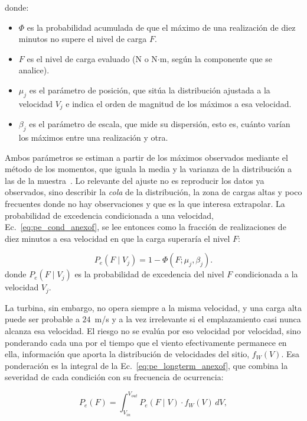 donde:
\begin{itemize}
    \item $\Phi$ es la probabilidad acumulada de que el máximo de una realización de diez minutos no supere el nivel de carga $F$.
    \item $F$ es el nivel de carga evaluado (N o N$\cdot$m, según la componente que se analice).
    \item $\mu_j$ es el parámetro de posición, que sitúa la distribución ajustada a la velocidad $V_j$ e indica el orden de magnitud de los máximos a esa velocidad.
    \item $\beta_j$ es el parámetro de escala, que mide su dispersión, esto es, cuánto varían los máximos entre una realización y otra.
\end{itemize}

Ambos parámetros se estiman a partir de los máximos observados mediante el método de los momentos, que iguala la media y la varianza de la distribución a las de la muestra~\parencite{Gumbel1958}. Lo relevante del ajuste no es reproducir los datos ya observados, sino describir la \textit{cola} de la distribución, la zona de cargas altas y poco frecuentes donde no hay observaciones y que es la que interesa extrapolar. La probabilidad de excedencia condicionada a una velocidad, Ec.~\ref{eq:pe_cond_anexof}, se lee entonces como la fracción de realizaciones de diez minutos a esa velocidad en que la carga superaría el nivel $F$:

\begin{equation}
P_e(F \mid V_j) = 1 - \Phi(F; \mu_j, \beta_j).
\label{eq:pe_cond_anexof}
\end{equation}
donde $P_e(F \mid V_j)$ es la probabilidad de excedencia del nivel $F$ condicionada a la velocidad $V_j$.

La turbina, sin embargo, no opera siempre a la misma velocidad, y una carga alta puede ser probable a $24$~m/s y a la vez irrelevante si el emplazamiento casi nunca alcanza esa velocidad. El riesgo no se evalúa por eso velocidad por velocidad, sino ponderando cada una por el tiempo que el viento efectivamente permanece en ella, información que aporta la distribución de velocidades del sitio, $f_W(V)$. Esa ponderación es la integral de la Ec.~\ref{eq:pe_longterm_anexof}, que combina la severidad de cada condición con su frecuencia de ocurrencia:

\begin{equation}
P_e(F) = \int_{V_{in}}^{V_{out}} P_e(F \mid V) \cdot f_W(V) \, dV,
\label{eq:pe_longterm_anexof}
\end{equation}

